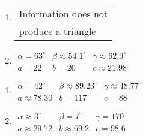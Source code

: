 \documentclass{ximera}
\begin{document}
\begin{multicols}{2} 

\begin{enumerate}

\setcounter{enumi}{\value{HW}}

\item \begin{tabular}{l}
Information does not \\
produce a triangle \end{tabular}

\item $\begin{array}{lll}
\alpha = 63^{\circ} & \beta \approx 54.1^{\circ} & \gamma \approx 62.9^{\circ} \\
a = 22 & b = 20 & c \approx 21.98 \end{array}$

\setcounter{HW}{\value{enumi}}

\end{enumerate}

\end{multicols}

\begin{multicols}{2} 

\begin{enumerate}

\setcounter{enumi}{\value{HW}}

\item $\begin{array}{lll}
\alpha = 42^{\circ} & \beta \approx 89.23^{\circ} & \gamma \approx 48.77^{\circ} \\
a \approx 78.30 & b = 117 & c = 88 \end{array}$

\item $\begin{array}{lll}
\alpha \approx 3^{\circ} & \beta = 7^{\circ} & \gamma = 170^{\circ} \\
a \approx 29.72 & b \approx 69.2 & c = 98.6 \end{array}$

\setcounter{HW}{\value{enumi}}

\end{enumerate}

\end{multicols}
\end{document}
